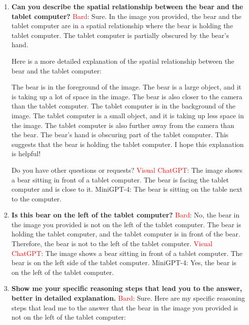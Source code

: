 \begin{enumerate}
    \item \textbf{Can you describe the spatial relationship between the bear and the tablet computer?}
    \subitem \textcolor{Red}{Bard}: Sure. In the image you provided, the bear and the tablet computer are in a spatial relationship where the bear is holding the tablet computer. The tablet computer is partially obscured by the bear's hand.

    Here is a more detailed explanation of the spatial relationship between the bear and the tablet computer:
    
    The bear is in the foreground of the image. The bear is a large object, and it is taking up a lot of space in the image. The bear is also closer to the camera than the tablet computer.
    The tablet computer is in the background of the image. The tablet computer is a small object, and it is taking up less space in the image. The tablet computer is also further away from the camera than the bear.
    The bear's hand is obscuring part of the tablet computer. This suggests that the bear is holding the tablet computer.
    I hope this explanation is helpful!
    
    Do you have other questions or requests?    
    \subitem \textcolor{red}{Visual ChatGPT}: The image shows a bear sitting in front of a tablet computer. The bear is facing the tablet computer and is close to it.
    \subitem MiniGPT-4: The bear is sitting on the table next to the computer.
    \item \textbf{Is this bear on the left of the tablet computer?}
    \subitem \textcolor{Red}{Bard}: 
    No, the bear in the image you provided is not on the left of the tablet computer. The bear is holding the tablet computer, and the tablet computer is in front of the bear. Therefore, the bear is not to the left of the tablet computer.
    \subitem \textcolor{red}{Visual ChatGPT}: The image shows a bear sitting in front of a tablet computer. The bear is on the left side of the tablet computer.
    \subitem MiniGPT-4: Yes, the bear is on the left of the tablet computer.
    \item \textbf{Show me your specific reasoning steps that lead you to the answer, better in detailed explanation.}
    \subitem \textcolor{Red}{Bard}: 
    Sure. Here are my specific reasoning steps that lead me to the answer that the bear in the image you provided is not on the left of the tablet computer:
    

\end{enumerate}
